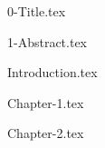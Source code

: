 \documentclass{book}
\begin{document}
\frontmatter
{0-Title.tex}
\clearpage
\thispagestyle{empty}
\tableofcontents

\mainmatter

{1-Abstract.tex}

{Introduction.tex}

{Chapter-1.tex}

{Chapter-2.tex}
\end{document}
